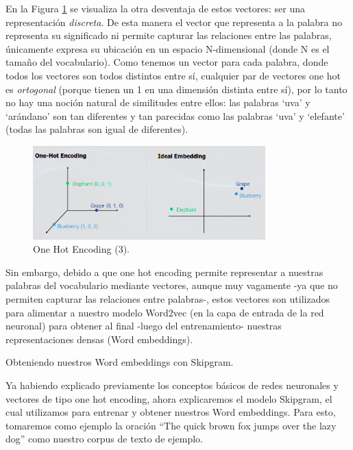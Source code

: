 \documentclass[12pt,a4paper]{article}
\makeatletter
\renewcommand\paragraph{\@startsection{paragraph}{4}{\z@}
            {-2.5ex\@plus -1ex \@minus -.25ex}
            {1.25ex \@plus .25ex}
            {\normalfont\normalsize\bfseries}}
\makeatother
\begin{document}
\begin{sloppypar}
En la Figura \ref{fig:Imagen_NLP_18} se visualiza la otra desventaja de estos vectores: ser una representación \textit{discreta}. De esta manera el vector que representa a la palabra no representa su significado ni permite capturar las relaciones entre las palabras, únicamente expresa su ubicación en un espacio N-dimensional (donde N es el tamaño del vocabulario). Como tenemos un vector para cada palabra, donde todos los vectores son todos distintos entre sí, cualquier par de vectores one hot es \textit{ortogonal} (porque tienen un 1 en una dimensión distinta entre sí), por lo tanto no hay una noción natural de similitudes entre ellos: las palabras ‘uva’ y ‘arándano’ son tan diferentes y tan parecidas como las palabras ‘uva’ y ‘elefante’ (todas las palabras son igual de diferentes). 

\begin{figure}[H]    
 \centering
 \includegraphics[width=0.8\textwidth]{images/NLP/18.png}
 \caption{One Hot Encoding (3)\cite{NLP_28}.}
 \label{fig:Imagen_NLP_18}
\end{figure}

Sin embargo, debido a que one hot encoding permite representar a nuestras palabras del vocabulario mediante vectores, aunque muy vagamente -ya que no permiten capturar las relaciones entre palabras-, estos vectores son utilizados para alimentar a nuestro modelo Word2vec (en la capa de entrada de la red neuronal) para obtener al final -luego del entrenamiento- nuestras representaciones densas (Word embeddings).

\cleardoublepage

\paragraph{Obteniendo nuestros Word embeddings con Skipgram.}\label{obt_skip}

Ya habiendo explicado previamente los conceptos básicos de redes neuronales y vectores de tipo one hot encoding, ahora explicaremos el modelo Skipgram, el cual utilizamos para entrenar y obtener nuestros Word embeddings. Para esto, tomaremos como ejemplo la oración “The quick brown fox jumps over the lazy dog” como nuestro corpus de texto de ejemplo.


\end{sloppypar}
\end{document}

